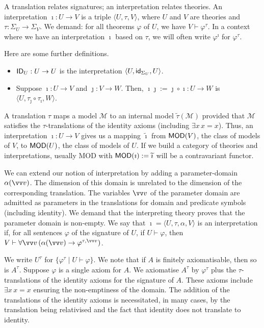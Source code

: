 \documentclass{amsart}
\renewcommand{\phi}{\varphi}
\newcommand{\tupel}[1]{{\langle #1 \rangle}}
\newcommand{\verz}[1]{\{ #1 \}}
\begin{document}
A translation relates signatures; an interpretation relates theories.
An interpretation $\imath:U\to V$ is a triple $\tupel{U,\tau,V}$, where $U$ and $V$ are theories and $\tau:\Sigma_U \to \Sigma_V$.
We demand: for all theorems $\phi$ of $U$, we have $V\vdash \phi^\tau$. In a context where we have an interpretation $\imath$ based on $\tau$, we will often write
$\phi^\imath$ for $\phi^\tau$.

Here are some further definitions.

\begin{itemize}
\item
${\sf ID}_U:U\to U$ is the interpretation $\tupel{U,{\sf id}_{\Sigma_U},U}$.
\item
Suppose $\imath:U\to V$ and $\jmath:V\to W$. Then, $\imath\jmath := \jmath\circ \imath:U\to W$ is $\tupel{U,\tau_\jmath\circ \tau_\imath,W}$.
\end{itemize}

\noindent
A translation $\tau$ maps a model $\mathcal M$ to an internal model $\widetilde \tau (\mathcal M)$ provided that 
$\mathcal M$ satisfies the $\tau$-translations of the identity axioms (including $\exists x\, x=x$). Thus, an interpretation $\imath:U\to V$ gives us a
mapping $\widetilde \imath$ from ${\sf MOD}(V)$,  the class of models of $V$, to ${\sf MOD}(U)$, the class
of models of $U$. If we build a category of theories and interpretations, usually {\sf MOD}
with ${\sf MOD} (\imath):= \widetilde \imath$ will be a contravariant functor.

We can extend our notion of interpretation by adding a parameter-domain $\alpha(\vv v)$. The dimension of this domain is
unrelated to the dimension of the corresponding translation. The variables $\vv v$ of the parameter domain are admitted
as parameters in the translations for domain and predicate symbols (including identity). We demand that the interpreting theory
proves that the parameter domain is non-empty.
We say that $\imath = \tupel{U,\tau,\alpha,V}$ is an interpretation if, for all sentences $\phi$ of the signature of
$U$, if $U \vdash \phi$, then
$V \vdash \forall \vv v\, (\alpha(\vv v) \to \phi^{\tau,\vv v})$.

 We write $U^\tau$ for $\verz{\phi^\tau \mathop\mid U \vdash \phi}$.
 We note that if $A$ is finitely axiomatisable, then so is $A^\tau$. Suppose $\phi$ is a single axiom for
 $A$. We axiomatise $A^\tau$ by $\phi^\tau$ plus the $\tau$-translations of the identity axioms for
 the signature of $A$. These axioms include $\exists x\, x=x$ ensuring the non-emptiness of the domain.
 The addition of the translations of the identity axioms is necessitated, in many cases, by the
 translation being relativised and the fact that identity does not translate to identity.
 
\end{document}
